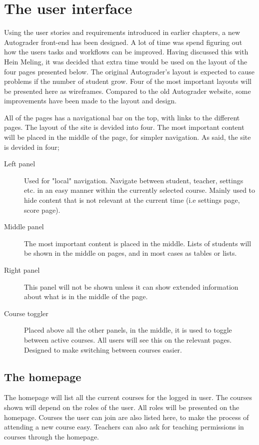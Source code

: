 \section{The user interface}

Using the user stories and requirements introduced in earlier chapters, a new Autograder front-end has been designed. A lot of time was spend figuring out how the users tasks and workflows can be improved. Having discussed this with Hein Meling, it was decided that extra time would be used on the layout of the four pages presented below. The original Autograder's layout is expected to cause problems if the number of student grow. Four of the most important layouts will be presented here as wireframes. Compared to the old Autograder website, some improvements have been made to the layout and design.

All of the pages has a navigational bar on the top, with links to the different pages. The layout of the site is devided into four. The most important content will be placed in the middle of the page, for simpler navigation. As said, the site is devided in four;


\begin{description}
\item [Left panel] Used for "local" navigation. Navigate between student, teacher, settings etc. in an easy manner within the currently selected course. Mainly used to hide content that is not relevant at the current time (i.e settings page, score page).
\item [Middle panel] The most important content is placed in the middle. Lists of students will be shown in the middle on pages, and in most cases as tables or lists.
\item [Right panel] This panel will not be shown unless it can show extended information about what is in the middle of the page.
\item [Course toggler] Placed above all the other panels, in the middle, it is used to toggle between active courses. All users will see this on the relevant pages. Designed to make switching between courses easier.
\end{description}

\subsection{The homepage}
The homepage will list all the current courses for the logged in user. The courses shown will depend on the roles of the user. All roles will be presented on the homepage. Courses the user can join are also listed here, to make the process of attending a new course easy. Teachers can also ask for teaching permissions in courses through the homepage.

